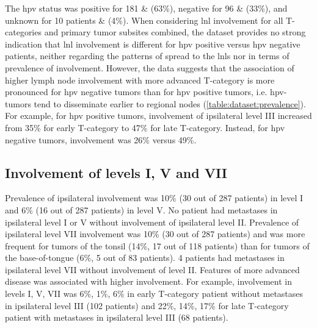 \documentclass[\relativeRoot/main.tex]{subfiles}
\begin{document}
The \gls{hpv} status was positive for 181 \& (63\%), negative for 96 \& (33\%), and unknown for 10 patients \& (4\%). When considering \gls{lnl} involvement for all T-categories and primary tumor subsites combined, the dataset provides no strong indication that \gls{lnl} involvement is different for \gls{hpv} positive versus \gls{hpv} negative patients, neither regarding the patterns of spread to the \glspl{lnl} nor in terms of prevalence of involvement. However, the data suggests that the association of higher lymph node involvement with more advanced T-category is more pronounced for \gls{hpv} negative tumors than for \gls{hpv} positive tumors, i.e. \gls{hpv}-tumors tend to disseminate earlier to regional nodes (\cref{table:dataset:prevalence}). For example, for \gls{hpv} positive tumors, involvement of ipsilateral level III increased from 35\% for early T-category to 47\% for late T-category. Instead, for \gls{hpv} negative tumors, involvement was 26\% versus 49\%.

\subsection*{Involvement of levels I, V and VII}

Prevalence of ipsilateral involvement was 10\% (30 out of 287 patients) in level I and 6\% (16 out of 287 patients) in level V. No patient had metastases in ipsilateral level I or V without involvement of ipsilateral level II. Prevalence of ipsilateral level VII involvement was 10\% (30 out of 287 patients) and was more frequent for tumors of the tonsil (14\%, 17 out of 118 patients) than for tumors of the base-of-tongue (6\%, 5 out of 83 patients). 4 patients had metastases in ipsilateral level VII without involvement of level II. Features of more advanced disease was associated with higher involvement. For example, involvement in levels I, V, VII was 6\%, 1\%, 6\% in early T-category patient without metastases in ipsilateral level III (102 patients) and 22\%, 14\%, 17\% for late T-category patient with metastases in ipsilateral level III (68 patients).
\end{document}
